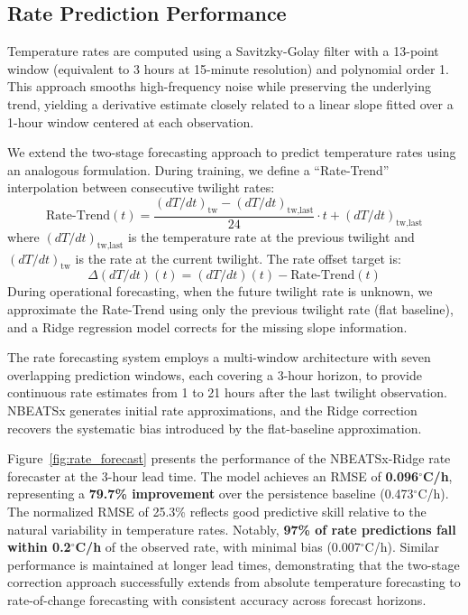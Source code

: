 \documentclass[11pt]{article}
\begin{document}
\subsection{Rate Prediction Performance}
Temperature rates are computed using a Savitzky-Golay filter with a 13-point window (equivalent to 3 hours at 15-minute resolution) and polynomial order 1. This approach smooths high-frequency noise while preserving the underlying trend, yielding a derivative estimate closely related to a linear slope fitted over a 1-hour window centered at each observation.

We extend the two-stage forecasting approach to predict temperature rates using an analogous formulation. During training, we define a ``Rate-Trend'' interpolation between consecutive twilight rates:
\begin{equation}
\text{Rate-Trend}(t) = \frac{(dT/dt)_{\text{tw}} - (dT/dt)_{\text{tw,last}}}{24} \cdot t + (dT/dt)_{\text{tw,last}}
\end{equation}
where $(dT/dt)_{\text{tw,last}}$ is the temperature rate at the previous twilight and $(dT/dt)_{\text{tw}}$ is the rate at the current twilight. The rate offset target is:
\begin{equation}
\Delta(dT/dt)(t) = (dT/dt)(t) - \text{Rate-Trend}(t)
\end{equation}
During operational forecasting, when the future twilight rate is unknown, we approximate the Rate-Trend using only the previous twilight rate (flat baseline), and a Ridge regression model corrects for the missing slope information.

The rate forecasting system employs a multi-window architecture with seven overlapping prediction windows, each covering a 3-hour horizon, to provide continuous rate estimates from 1 to 21 hours after the last twilight observation. NBEATSx generates initial rate approximations, and the Ridge correction recovers the systematic bias introduced by the flat-baseline approximation.

Figure~\ref{fig:rate_forecast} presents the performance of the NBEATSx-Ridge rate forecaster at the 3-hour lead time. The model achieves an RMSE of \textbf{0.096$^\circ$C/h}, representing a \textbf{79.7\% improvement} over the persistence baseline (0.473$^\circ$C/h). The normalized RMSE of 25.3\% reflects good predictive skill relative to the natural variability in temperature rates. Notably, \textbf{97\% of rate predictions fall within 0.2$^\circ$C/h} of the observed rate, with minimal bias (0.007$^\circ$C/h). Similar performance is maintained at longer lead times, demonstrating that the two-stage correction approach successfully extends from absolute temperature forecasting to rate-of-change forecasting with consistent accuracy across forecast horizons.
\end{document}
